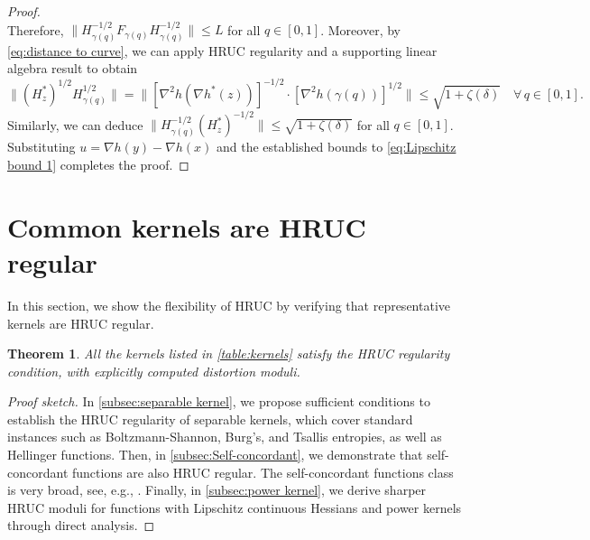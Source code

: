 \documentclass{article}
\theoremstyle{plain}
\newtheorem{theorem}{Theorem}[section]
\theoremstyle{definition}
\theoremstyle{remark}
\newcommand{\sL}{L}
\begin{document}
\begin{proof}
\[\]
Therefore, $\| H_{\gamma(q)}^{-1/2} F_{\gamma(q)} H_{\gamma(q)}^{-1/2} \| \leq \sL$ for all $q \in [0,1]$.  Moreover, by \eqref{eq:distance to curve}, we can apply HRUC regularity and a supporting linear algebra result  to obtain
\[
\big\| (H_z^*)^{1/2} H_{\gamma(q)}^{1/2} \big\| = \big\| [\nabla^2 h(\nabla h^*(z))]^{-1/2} \cdot [\nabla^2 h(\gamma(q))]^{1/2} \big\| \leq \sqrt{1 + \zeta(\delta)} \quad \forall\, q \in [0,1].
\]
Similarly, we can deduce $\| H_{\gamma(q)}^{-1/2} (H_z^*)^{-1/2} \| \leq \sqrt{1 + \zeta(\delta)}$ for all $q \in [0,1]$. Substituting $u = \nabla h(y) - \nabla h(x)$ and the established bounds to \eqref{eq:Lipschitz bound 1} completes the proof. 
\end{proof}

\section{Common kernels are HRUC regular}\label{sec:HRUC of kernels}
In this section, we show the flexibility of HRUC by verifying that representative kernels are HRUC regular.
\begin{theorem}
    \label{theorem:HURC-List} All the kernels listed in \cref{table:kernels} satisfy the HRUC regularity condition, with explicitly computed distortion moduli. 
\end{theorem}
\begin{proof}[Proof sketch]
In \cref{subsec:separable kernel}, we propose sufficient conditions to establish the HRUC regularity of separable kernels, which cover standard instances such as Boltzmann-Shannon, Burg's, and Tsallis entropies, as well as Hellinger functions. Then, in \cref{subsec:Self-concordant}, we demonstrate that self-concordant functions are also HRUC regular. The self-concordant functions class is very broad, see, e.g., \cite[Chapter 5.1]{Nesterov2018}. Finally, in \cref{subsec:power kernel}, we derive sharper HRUC moduli for functions with Lipschitz continuous Hessians and power kernels through direct analysis.
\end{proof}
\end{document}
